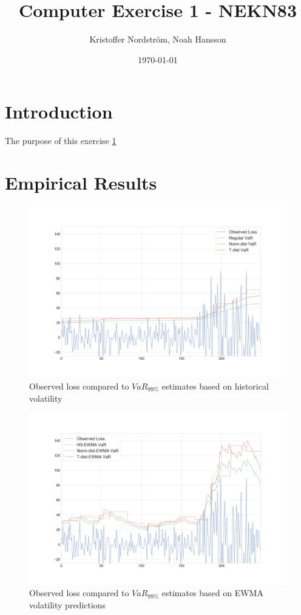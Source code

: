 \documentclass[a4paper]{article}
\title{Computer Exercise 1 - NEKN83}
\author{Kristoffer Nordström, Noah Hansson}
\date{\today}
\begin{document}
\maketitle

\section{Introduction}
The purpose of this exercise \ref{var1}

\section{Empirical Results}

\begin{figure}
    \includegraphics[width=\textwidth]{VaR1.png}
    \caption{Observed loss compared to $VaR_{99\%}$ estimates based on historical volatility}
    \label{var1}
\end{figure}

\begin{figure}
    \includegraphics[width=\textwidth]{VaR2.png}
    \caption{Observed loss compared to $VaR_{99\%}$ estimates based on EWMA volatility predictions}
    \label{var2}
\end{figure}
\end{document}
